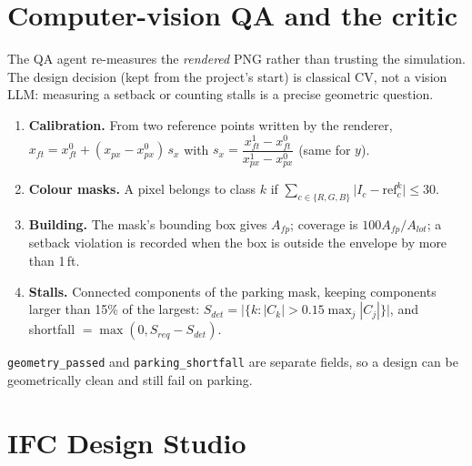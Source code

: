 \documentclass[10pt,a4paper]{article}
\newcommand{\code}[1]{\texttt{\small #1}}
\theoremstyle{definition}
\begin{document}
\section{Computer-vision QA and the critic}
\label{sec:cv}

The QA agent re-measures the \emph{rendered} PNG rather than trusting the simulation. The design decision (kept from the
project's start) is classical CV, not a vision LLM: measuring a setback or counting stalls is a precise geometric
question.
\begin{enumerate}
\item \textbf{Calibration.} From two reference points written by the renderer,
$x_{ft}=x^0_{ft}+(x_{px}-x^0_{px})\,s_x$ with $s_x=\dfrac{x^1_{ft}-x^0_{ft}}{x^1_{px}-x^0_{px}}$ (same for $y$).
\item \textbf{Colour masks.} A pixel belongs to class $k$ if $\sum_{c\in\{R,G,B\}}\lvert I_c-\mathrm{ref}^k_c\rvert\le30$.
\item \textbf{Building.} The mask's bounding box gives $A_{fp}$; coverage is $100A_{fp}/A_{lot}$; a setback violation is
recorded when the box is outside the envelope by more than 1\,ft.
\item \textbf{Stalls.} Connected components of the parking mask, keeping components larger than 15\% of the largest:
$S_{det}=\lvert\{k: |C_k|>0.15\max_j|C_j|\}\rvert$, and shortfall $=\max(0,S_{req}-S_{det})$.
\end{enumerate}
\code{geometry\_passed} and \code{parking\_shortfall} are separate fields, so a design can be geometrically clean and
still fail on parking.

\section{IFC Design Studio}
\label{sec:ifc}
\end{document}
